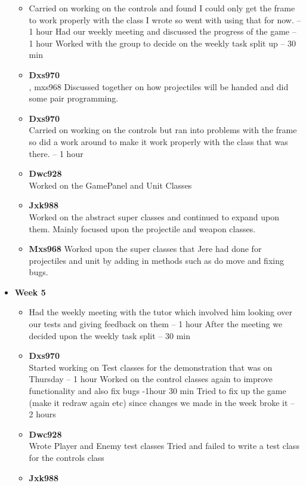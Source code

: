 \begin{itemize}
  \begin{itemize}
  \item Carried on working on the controls and found I could only get
    the frame to work properly with the class I wrote so went with
    using that for now. – 1 hour Had our weekly meeting and discussed
    the progress of the game – 1 hour Worked with the group to decide
    on the weekly task split up – 30 min
  \item \textbf{Dxs970}\\, mxs968 Discussed together on how
    projectiles will be handed and did some pair programming.
  \item \textbf{Dxs970}\\
    Carried on working on the controls but ran into problems with the
    frame so did a work around to make it work properly with the class
    that was there. – 1 hour
  \item \textbf{Dwc928}\\
    Worked on the GamePanel and Unit Classes
  \item \textbf{Jxk988}\\
    Worked on the abstract super classes and continued to expand upon
    them.  Mainly focused upon the projectile and weapon classes.
  \item \textbf{Mxs968} Worked upon the super classes that Jere had
    done for projectiles and unit by adding in methods such as do move
    and fixing bugs.
  \end{itemize}
\item \textbf{Week 5}
  \begin{itemize}
  \item Had the weekly meeting with the tutor which involved him
    looking over our tests and giving feedback on them – 1 hour After
    the meeting we decided upon the weekly task split – 30 min
  \item \textbf{Dxs970}\\
    Started working on Test classes for the demonstration that was on
    Thursday – 1 hour Worked on the control classes again to improve
    functionality and also fix bugs -1hour 30 min Tried to fix up the
    game (make it redraw again etc) since changes we made in the week
    broke it – 2 hours
  \item \textbf{Dwc928}\\
    Wrote Player and Enemy test classes Tried and failed to write a
    test class for the controls class
  \item \textbf{Jxk988}\\

\end{itemize}
\end{itemize}
